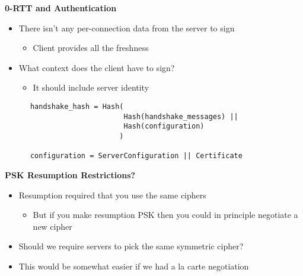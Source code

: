 \documentclass[helvetica]{seminar}
\newcommand{\heading}[1]{%
  \begin{center} 
    \large\bf 
    #1 
  \end{center} 
  \vspace{.4 in}}
\begin{document}
\begin{slide}
\heading{0-RTT and Authentication}

\begin{itemize}
\item There isn't any per-connection data from the server to sign
  \begin{itemize}
  \item Client provides all the freshness
  \end{itemize}
\item What context does the client have to sign?
  \begin{itemize}
  \item It should include server identity
  \end{itemize}
\end{itemize}

\begin{footnotesize}
\begin{verbatim}
      handshake_hash = Hash(
                            Hash(handshake_messages) ||
                            Hash(configuration)
                           )

      configuration = ServerConfiguration || Certificate                           
\end{verbatim}
\end{footnotesize}
\end{slide}


\begin{slide}
\heading{PSK Resumption Restrictions?}

\begin{itemize}
\item Resumption required that you use the same ciphers
  \begin{itemize}
  \item But if you make resumption PSK then you could in principle negotiate a new cipher
  \end{itemize}

\item Should we require servers to pick the same symmetric cipher?
\item This would be somewhat easier if we had a la carte negotiation
\end{itemize}
\end{slide}
\end{document}
